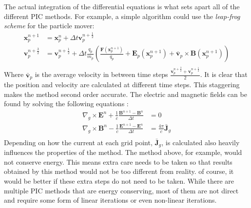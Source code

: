 The actual integration of the differential equations is what sets apart all of the different PIC methods. For example, a simple algorithm could use the \textit{leap-frog scheme} for the particle mover: 
\begin{align*}
	\textbf{x}_p^{n+1} &= \textbf{x}_p^n + \Delta t \textbf{v}_p^{n+\frac{1}{2}} \\
	\textbf{v}_p^{n+\frac{3}{2}} &= \textbf{v}_p^{n+\frac{1}{2}} + \Delta t \frac{q_p}{m_p}\left(\frac{\textbf{F}(\textbf{x}_p^{n+1})}{q_p} +\textbf{E}_p(\textbf{x}_p^{n+1}) + \bar{\textbf{v}}_p \times \textbf{B}(\textbf{x}_p^{n+1})\right)\\
\end{align*}
Where $\bar{\textbf{v}}_p$ is the average velocity in between time steps $\frac{\textbf{v}_p^{n+\frac{3}{2}}+\textbf{v}_p^{n+\frac{1}{2}}}{2}$.
It is clear that the position and velocity are calculated at different time steps. This staggering makes the method second order accurate. The electric and magnetic fields can be found by solving the following equations \cite{jiang_origin_1996}:
  \begin{align*}
	\nabla_g \times \mathbf{E}^{n} +\frac{1}{c}\frac{\mathbf{B}^{n+1} - \mathbf{B}^{n}}{\Delta t} &= 0 \\
	\nabla_g \times \mathbf{B}^{n} -\frac{1}{c}\frac{\mathbf{E}^{n+1} - \mathbf{E}^{n}}{\Delta t} &= \frac{4 \pi}{c}\bar{\mathbf{J}}_g\\
\end{align*}
Depending on how the current at each grid point, $\bar{\mathbf{J}}_g$, is calculated also heavily influences the properties of the method. The method above, for example, would not conserve energy. This means extra care needs to be taken so that results obtained by this method would not be too different from reality. of course, it would be better if these extra steps do not need to be taken. While there are multiple PIC methods that are energy conserving, most of them are not direct and require some form of linear iterations or even non-linear iterations. \cite{giovanni_lapenta_introduction_nodate}

